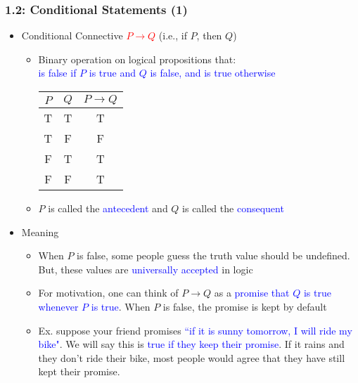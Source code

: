 \documentclass[10pt,english]{beamer}
\begin{document}
\begin{frame} \frametitle{1.2: Conditional Statements (1)}

\begin{itemize}

\item Conditional Connective \textcolor{red}{$P \rightarrow Q$} (i.e., if $P$, then $Q$)

\begin{itemize}
  \setlength\itemsep{2mm}
  \item Binary operation on logical propositions that:\\ \hspace{2mm} \textcolor{blue}{is false if $P$ is true and $Q$ is false, and is true otherwise} \\

\begin{center}
\begin{tabular}{|c|c|c|}
\hline
$P$ & $Q$ & $P \rightarrow Q$ \\
\hline
T & T & T \\
T & F & F \\
F & T & T \\
F & F & T \\
\hline
\end{tabular}
\end{center}

\item $P$ is called the \textcolor{blue}{antecedent} and $Q$ is called the \textcolor{blue}{consequent}

\end{itemize}
\vspace{1mm}

\item Meaning

\begin{itemize}
\setlength\itemsep{1.5mm}
\item When $P$ is false, some people guess the truth value should be undefined. But, these values are \textcolor{blue}{universally accepted} in logic

\item For motivation, one can think of $P \rightarrow Q$ as a \textcolor{blue}{promise that $Q$ is true whenever $P$ is true}. When $P$ is false, the promise is kept by default

\item Ex. suppose your friend promises \textcolor{blue}{``if it is sunny tomorrow, I will ride my bike"}.  We will say this is \textcolor{blue}{true if they keep their promise}.
If it rains and they don't ride their bike, most people would agree that they have still kept their promise.

\end{itemize}
\end{itemize}

\end{frame}
\end{document}
